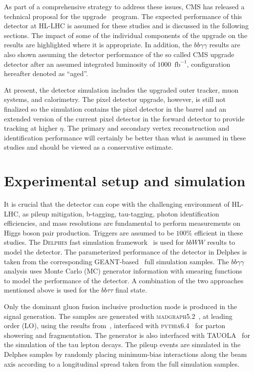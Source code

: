 As part of a comprehensive strategy to address these issues, CMS has released a technical proposal for the \phasetwo upgrade~\cite{Butler:2020886} program. The expected performance of this detector at HL-LHC is assumed for these studies and is discussed in the following sections. The impact of some of the individual components of the \phasetwo upgrade on the results are highlighted where it is appropriate. In addition, the $bb\gamma\gamma$ results are also shown assuming the detector performance of the so called \phaseone CMS upgrade~\cite{Collaboration:1355706} detector after an assumed integrated luminosity of $1000$~$\mathrm{fb}^{-1}$, configuration hereafter denoted as ``\phaseone aged''.

At present, the \phasetwo detector simulation includes the upgraded outer tracker, muon systems, and calorimetry. The pixel detector upgrade, however, is still not finalized so the simulation contains the \phaseone pixel detector in the barrel and an extended version of the current pixel detector in the forward detector to provide tracking at higher $\eta$. The primary and secondary vertex reconstruction and identification performance will certainly be better
than what is assumed in these studies and should be viewed as a conservative estimate.

\section{Experimental setup and simulation}
\label{sec:exp_cond}
It is crucial that the \phasetwo detector can cope with the challenging environment of HL-LHC, as pileup mitigation, b-tagging, tau-tagging, photon identification efficiencies, and mass 
resolutions are fundamental to perform measurements on Higgs boson pair production. Triggers are assumed to be $100\%$ efficient in these studies. The \textsc{Delphes} fast simulation framework~\cite{deFavereau:2013fsa} is used 
for $bbWW$ results to model the \phasetwo detector. The parameterized performance of the \phasetwo detector in Delphes is taken from the corresponding GEANT-based~\cite{Agostinelli:2002hh} full simulation  samples. The $bb\gamma\gamma$ analysis uses Monte Carlo (MC) generator information with smearing functions to model the performance of the detector. A combination of the two approaches mentioned above is used for the $bb\tau\tau$ final state.  

Only the dominant gluon fusion inclusive production mode is produced in the signal generation. The samples are generated with \textsc{madgraph5.2}~\cite{Alwall:2011uj}, at leading order (LO), using the results from~\cite{Frederix2014142}, interfaced with  \textsc{pythia6.4}~\cite{PYTHIA} for parton showering and fragmentation. The generator is also interfaced with TAUOLA~\cite{tauola} for the simulation of the tau lepton decays. The pileup events are simulated in the Delphes samples by randomly placing minimum-bias interactions along the beam axis according to a longitudinal spread taken from the full simulation samples.


